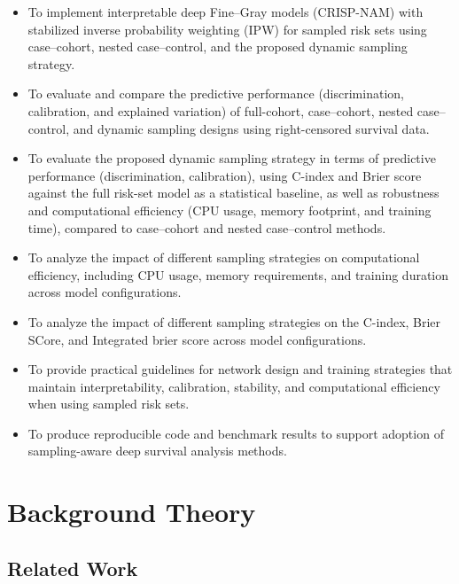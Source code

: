 \documentclass[a4paper,twoside,12pt]{report}
\begin{document}
\begin{itemize}
  \item To implement interpretable deep Fine–Gray models (CRISP-NAM) with stabilized inverse probability weighting (IPW) for sampled risk sets using case–cohort, nested case–control, and the proposed dynamic sampling strategy.

  \item To evaluate and compare the predictive performance (discrimination, calibration, and explained variation) of full-cohort, case–cohort, nested case–control, and dynamic sampling designs using right-censored survival data.

  \item To evaluate the proposed dynamic sampling strategy in terms of predictive performance (discrimination, calibration), using C-index and Brier score against the full risk-set model as a statistical baseline, as well as robustness and computational efficiency (CPU usage, memory footprint, and training time), compared to case–cohort and nested case–control methods.

  \item To analyze the impact of different sampling strategies on computational efficiency, including CPU usage, memory requirements, and training duration across model configurations.

 \item To analyze the impact of different sampling strategies on the C-index, Brier SCore, and Integrated brier score across model configurations.

  \item To provide practical guidelines for network design and training strategies that maintain interpretability, calibration, stability, and computational efficiency when using sampled risk sets.

  \item To produce reproducible code and benchmark results to support adoption of sampling-aware deep survival analysis methods.
\end{itemize}


\chapter{Background Theory}

\section{Related Work}
\end{document}
